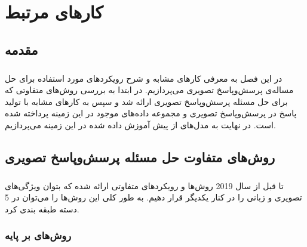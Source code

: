
\chapter{کارهای مرتبط} \label{ch:related}
\thispagestyle{empty}


\section{مقدمه}
\label{sec:intro}
\paragraph{}
{
    در این فصل به معرفی کارهای مشابه و شرح
    رویکردهای مورد استفاده برای حل مساله‌ی پرسش‌و‌پاسخ تصویری می‌پردازیم.
    در ابتدا به بررسی روش‌های متفاوتی که برای حل مسئله پرسش‌وپاسخ تصویری 
    ارائه شد و سپس به کارهای مشابه با تولید پاسخ در پرسش‌وپاسخ تصویری
    و مجموعه داده‌های موجود در این زمینه پرداخته ‌شده است. در نهایت به 
    مدل‌های از پیش‌ آموزش داده شده در این زمینه می‌پردازیم.  
}

\section{
    روش‌های متفاوت حل مسئله پرسش‌وپاسخ تصویری
}
\label{sec:approches_vqa}
\paragraph{}{
    تا قبل از سال 2019 روش‌ها و رویکرد‌های متفاوتی ارائه شده که 
    بتوان ویژگی‌های تصویری و زبانی را در کنار یکدیگر قرار دهیم. به طور کلی
    این روش‌ها را می‌توان در 5 دسته طبقه بندی کرد. 
}
\subsection{
    روش‌های بر پایه 
}
\label{sec:binilear_pooling}
